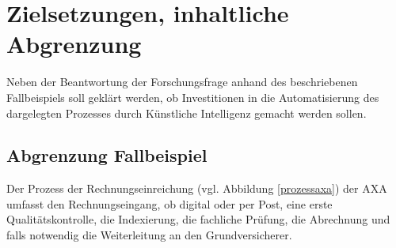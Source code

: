 \documentclass{hwz}
\begin{document}

%
%
%
%
%
%
%
%

\newpage
\section{Zielsetzungen, inhaltliche Abgrenzung}


Neben der Beantwortung der Forschungsfrage anhand des beschriebenen Fallbeispiels soll geklärt werden, ob Investitionen in die Automatisierung des dargelegten Prozesses durch Künstliche Intelligenz gemacht werden sollen.



\subsection{Abgrenzung Fallbeispiel}

Der Prozess der Rechnungseinreichung (vgl. Abbildung \ref{prozessaxa}) der AXA umfasst den Rechnungseingang, ob digital oder per Post, eine erste Qualitätskontrolle, die Indexierung, die fachliche Prüfung, die Abrechnung und falls notwendig die Weiterleitung an den Grundversicherer.
\end{document}
